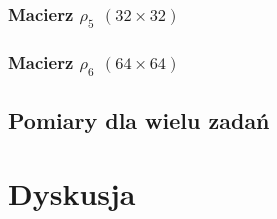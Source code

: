 \documentclass[11pt, a4paper]{article}
\begin{document}
\begin{sloppypar}
    \subsubsection{Macierz $\rho_{5}$ $(32\times32)$}


    \subsubsection{Macierz $\rho_{6}$ $(64\times64)$}


    \subsection{Pomiary dla wielu zadań}


    \section{Dyskusja}
  \end{sloppypar}
  \newpage
  \begin{sloppypar}
    \medskip


    \printbibliography
    [heading=bibintoc, title={Odwołania}]
  \end{sloppypar}
\end{document}
